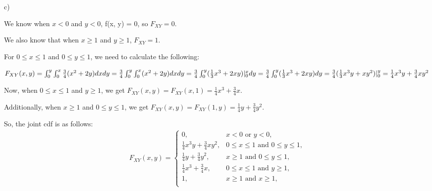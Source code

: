 \begin{solution}
c) 

We know when $x < 0$ and $y < 0$, f(x, y) = 0, so $F_{XY} = 0$.

We also know that when $x \geq 1$ and $y \geq 1$, $F_{XY} = 1$. 

For $0 \leq x \leq 1$ and $0 \leq y \leq 1$, we need to calculate the following:

$F_{XY}(x, y) = \int_{0}^{y}\int_{0}^{x} \frac{3}{4}(x^2 + 2y) dx dy\\
= \frac{3}{4}\int_{0}^{y}\int_{0}^{x}(x^2 + 2y) dx dy\\
= \frac{3}{4}\int_{0}^{y}(\frac{1}{3}x^3 + 2xy)\rvert_0^x dy\\
= \frac{3}{4}\int_{0}^{y}(\frac{1}{3}x^3 + 2xy) dy\\
= \frac{3}{4}(\frac{1}{3}x^3y + xy^2)\rvert_0^y\\
= \frac{1}{4}x^3y + \frac{3}{4}xy^2$

Now, when $0 \leq x \leq 1$ and $y \geq 1$, we get $F_{XY}(x, y) = F_{XY}(x, 1) = \frac{1}{4}x^3 + \frac{3}{4}x$.

Additionally, when $x \geq 1$ and $0 \leq y \leq 1$, we get $F_{XY}(x, y) = F_{XY}(1, y) = \frac{1}{4}y + \frac{3}{4}y^2$.

So, the joint cdf is as follows:\\

\begin{align*}
	F_{XY}(x,y) = \left.
	\begin{cases}
		0, &\text{$x < 0$ or $y < 0$,} \\
		\frac{1}{4}x^3y + \frac{3}{4}xy^2, &\text{$0 \leq x \leq 1$ and $0 \leq y \leq 1$,} \\
		\frac{1}{4}y + \frac{3}{4}y^2, &\text{$x \geq 1$ and $0 \leq y \leq 1$,} \\
		\frac{1}{4}x^3 + \frac{3}{4}x, &\text{$0 \leq x \leq 1$ and $y \geq 1$,} \\
		1, &\text{$x \geq 1$ and $x \geq 1$,} \\
	\end{cases}
	\right.
\end{align*}
\end{solution}